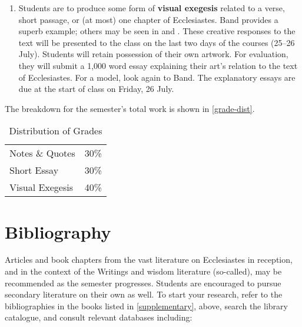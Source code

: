 \documentclass[titlepage]{article}
\newcommand\policy{../policy}
\begin{document}
\begin{enumerate}
	\item Students are to produce some form of \textbf{visual exegesis}
	related to a verse, short passage, or (at most) one chapter of
	Ecclesiastes. Band provides a superb example; others may be seen in
	\cite{Christianson} and \cite{Short}. These creative responses to
	the text will be presented to the class on the last two days of the
	courses (25–26 July). Students will retain possession of their own
	artwork. For evaluation, they will submit a 1,000 word essay
	explaining their art’s relation to the text of Ecclesiastes. For a
	model, look again to Band. The explanatory essays are due at the
	start of class on Friday, 26 July.

\end{enumerate}

The breakdown for the semester's total work is shown in
\autoref{grade-dist}.

\begin{table}[htbp]
  \centering
  {\lining
  \begin{tabular}{lr}
    \toprule
    Notes \& Quotes     & 30\% \\
    Short Essay         & 30\% \\
    Visual Exegesis     & 40\% \\
    \bottomrule
  \end{tabular}}
  \caption{Distribution of Grades}
  \label{grade-dist}
\end{table}





\section{Bibliography}
\label{bib}

Articles and book chapters from the vast literature on Ecclesiastes in
reception, and in the context of the Writings and wisdom literature
(so-called), may be recommended as the semester progresses. Students are
encouraged to pursue secondary literature on their own as well. To start
your research, refer to the bibliographies in the books listed in
\autoref{supplementary}, above, search the library catalogue, and
consult relevant databases including:
\end{document}
